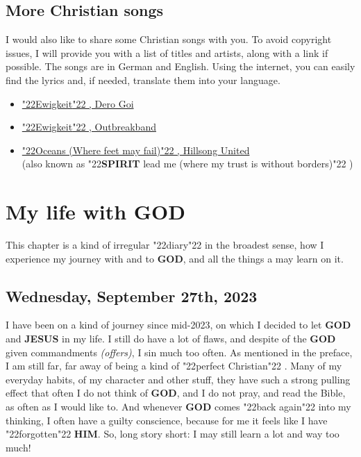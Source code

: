 \documentclass[10pt,a5paper]{article}
\newcommand{\God}[0]{\textbf{GOD}}
\newcommand{\Him}[0]{\textbf{HIM}}
\newcommand{\Jesus}[0]{\textbf{JESUS}}
\newcommand{\Spirit}[0]{\textbf{SPIRIT}}
\newcommand{\q}[1]{\char"22{#1}\char"22 }
\begin{document}
	\subsection{More Christian songs}
		I would also like to share some Christian songs with you.
		To avoid copyright issues,
		I will provide you with a list of titles and artists,
		along with a link if possible.
		The songs are in German and English.
		Using the internet,
		you can easily find the lyrics and,
		if needed,
		translate them into your language.
		\begin{itemize}[noitemsep]
			\item	\href{https://www.youtube.com/watch?v=Oncj9JBo1xQ}{\q{Ewigkeit},
					Dero Goi}
			\item	\href{https://www.youtube.com/watch?v=PcxaUHkmnSQ}{\q{Ewigkeit},
					Outbreakband}
			\item	\href{https://www.youtube.com/watch?v=DqlpyrHB_Qk}{\q{Oceans (Where feet may fail)},
					Hillsong United}
					\\
					(also known as \q{{\Spirit} lead me (where my trust is without borders)})
		\end{itemize}
				
	\newpage
	\section{My life with {\God}} \label{MeinLebenMitGott}
		This chapter is a kind of irregular \q{diary} in the broadest sense,
		how I experience my journey with and to {\God},
		and all the things a may learn on it.
	
	\subsection{Wednesday, September 27th, 2023}
		I have been on a kind of journey since mid-2023,
		on which I decided to let {\God} and {\Jesus} in my life.
		I still do have a lot of flaws,
		and despite of the {\God} given commandments \textit{(offers)},
		I sin much too often.
		As mentioned in the preface,
		I am still far,
		far away of being a kind of \q{perfect Christian}.
		Many of my everyday habits,
		of my character and other stuff,
		they have such a strong pulling effect
		that often I do not think of {\God},
		and I do not pray,
		and read the Bible,
		as often as I would like to.
		And whenever {\God} comes \q{back again} into my thinking,
		I often have a guilty conscience,
		because for me it feels like I have \q{forgotten} {\Him}.
		So,
		long story short:
		I may still learn a lot and way too much!
\end{document}

